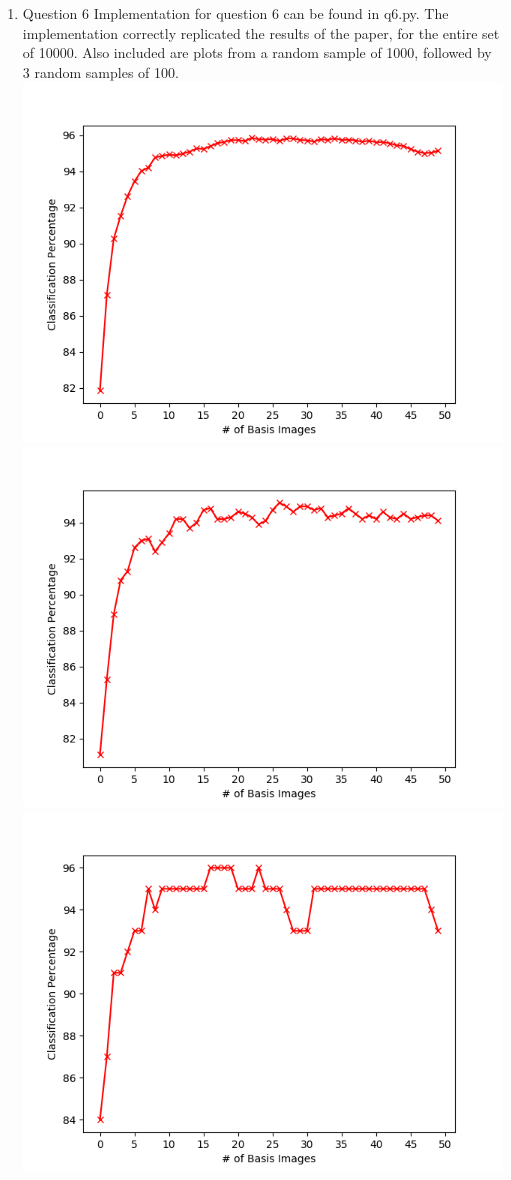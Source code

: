 \documentclass[11pt]{article}
\begin{document}
\begin{enumerate}
\item Question 6\newline
Implementation for question 6 can be found in q6.py. The implementation correctly replicated the results of the paper, for the entire set of 10000.\newline
Also included are plots from a random sample of 1000, followed by 3 random samples of 100.\newline
\includegraphics[width=0.7\columnwidth]{q6-graphEntireSet10000}\newline
\includegraphics[width=0.7\columnwidth]{q6-graphRandomSample1000}\newline
\includegraphics[width=0.7\columnwidth]{q6-graphRandomSample100-1}\newline

\end{enumerate}
\end{document}
